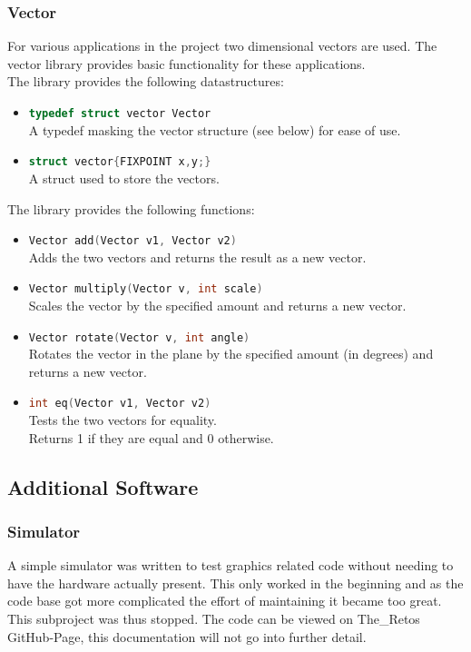 \documentclass{report}
\begin{document}
\subsubsection{Vector}
For various applications in the project two dimensional vectors are used. The vector library provides basic functionality for these applications. \\
The library provides the following datastructures:
\begin{itemize}
	\item \lstinline[language=c++]{typedef struct vector Vector} \\
		A typedef masking the vector structure (see below) for ease of use.
	\item \lstinline[language=c++]!struct vector{FIXPOINT x,y;}! \\
		A struct used to store the vectors.
\end{itemize}
The library provides the following functions:
\begin{itemize}
	\item \lstinline[language=c++]{Vector add(Vector v1, Vector v2)}\\
		Adds the two vectors and returns the result as a new vector.
	\item \lstinline[language=c++]{Vector multiply(Vector v, int scale)}\\
		Scales the vector by the specified amount and returns a new vector.
	\item \lstinline[language=c++]{Vector rotate(Vector v, int angle)}\\
		Rotates the vector in the plane by the specified amount (in degrees) and returns a new vector.
	\item \lstinline[language=c++]{int eq(Vector v1, Vector v2)}\\
		Tests the two vectors for equality.\\
		Returns 1 if they are equal and 0 otherwise.
\end{itemize}
\subsection{Additional Software}
\subsubsection{Simulator}\label{simulator}
A simple simulator was written to test graphics related code without needing to have the hardware actually present. This only worked in the beginning and as the code base got more complicated the effort of maintaining it became too great. This subproject was thus stopped. The code can be viewed on The\_Retos GitHub-Page, this documentation will not go into further detail.
\end{document}

